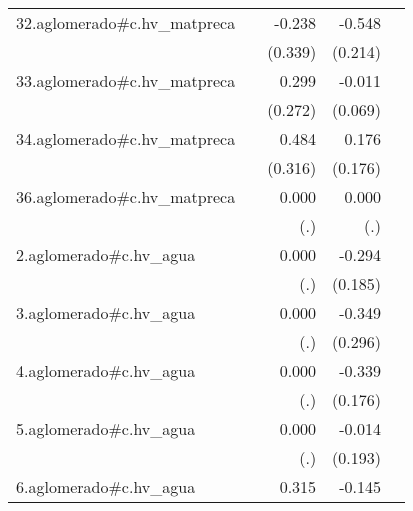 {\begin{longtable}{l*{4}{D{.}{.}{-1}}}
\addlinespace
32.aglomerado#c.hv\_matpreca&                     &      -0.238         &      -0.548\sym{*}  &                     \\
            &                     &     (0.339)         &     (0.214)         &                     \\
\addlinespace
33.aglomerado#c.hv\_matpreca&                     &       0.299         &      -0.011         &                     \\
            &                     &     (0.272)         &     (0.069)         &                     \\
\addlinespace
34.aglomerado#c.hv\_matpreca&                     &       0.484         &       0.176         &                     \\
            &                     &     (0.316)         &     (0.176)         &                     \\
\addlinespace
36.aglomerado#c.hv\_matpreca&                     &       0.000         &       0.000         &                     \\
            &                     &         (.)         &         (.)         &                     \\
\addlinespace
2.aglomerado#c.hv\_agua&                     &       0.000         &      -0.294         &                     \\
            &                     &         (.)         &     (0.185)         &                     \\
\addlinespace
3.aglomerado#c.hv\_agua&                     &       0.000         &      -0.349         &                     \\
            &                     &         (.)         &     (0.296)         &                     \\
\addlinespace
4.aglomerado#c.hv\_agua&                     &       0.000         &      -0.339         &                     \\
            &                     &         (.)         &     (0.176)         &                     \\
\addlinespace
5.aglomerado#c.hv\_agua&                     &       0.000         &      -0.014         &                     \\
            &                     &         (.)         &     (0.193)         &                     \\
\addlinespace
6.aglomerado#c.hv\_agua&                     &       0.315         &      -0.145         &                     \\

\end{longtable}}
